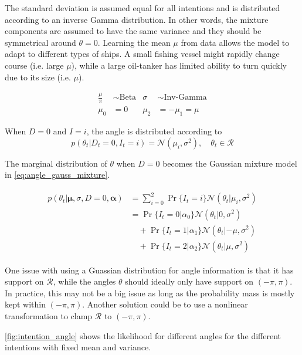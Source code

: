 The standard deviation is assumed equal for all intentions and is distributed according to an inverse Gamma distribution. In other words, the mixture components are assumed to have the same variance and they should be symmetrical around $\theta=0$.
Learning the mean $\mu$ from data allows the model to adapt to different types of ships. A small fishing vessel might rapidly change course (i.e. large $\mu$), while a large oil-tanker has limited ability to turn quickly due to its size (i.e. $\mu$). 

\begin{align}
     \frac{\mu}{\pi} &\sim \text{Beta} & \sigma &\sim \text{Inv-Gamma} \\
     \mu_0 &= 0 & \mu_{2} &= -\mu_{1} = \mu
\end{align}

When $D=0$ and $I=i$, the angle is distributed according to
\begin{equation}\label{eq:theta_intention_mixture}
    p(\theta_t | D_t=0, I_t=i) = \mathcal{N}(\mu_i, \sigma^2), \quad \theta_t \in \mathcal{R}
\end{equation}

The marginal distribution of $\theta$ when $D=0$ becomes the Gaussian mixture model in \cref{eq:angle_gauss_mixture}.

\begin{align}\label{eq:angle_gauss_mixture}
\begin{split}
    p(\theta_t | \boldsymbol{\mu}, \sigma, D=0, \boldsymbol{\alpha}) &= \sum_{i=0}^2 \Pr\{I_t=i\}\mathcal{N}(\theta_t | \mu_i, \sigma^2) \\
    &=\Pr\{I_t=0 | \alpha_0\}\mathcal{N}(\theta_t | 0, \sigma^2)\\
    &\quad+\Pr\{I_t=1 | \alpha_1\}\mathcal{N}(\theta_t | -\mu, \sigma^2)\\
    &\quad+\Pr\{I_t=2 | \alpha_2\}\mathcal{N}(\theta_t | \mu, \sigma^2)
\end{split}
\end{align}

One issue with using a Guassian distribution for angle information is that it has support on $\mathcal{R}$, while the angles $\theta$ should ideally only have support on $(-\pi, \pi)$. In practice, this may not be a big issue as long as the probability mass is mostly kept within $(-\pi, \pi)$. Another solution could be to use a nonlinear transformation to clamp $\mathcal{R}$ to $(-\pi, \pi)$.

\cref{fig:intention_angle} shows the likelihood for different angles for the different intentions with fixed mean and variance. 


